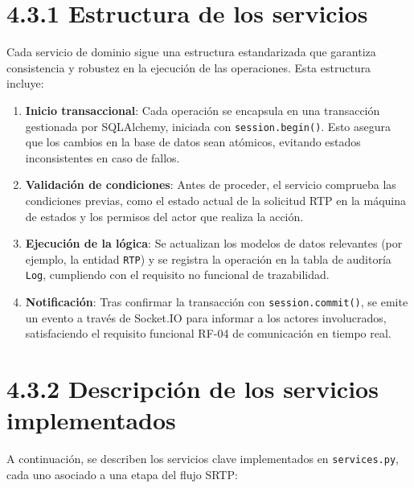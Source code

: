\section*{4.3.1 Estructura de los servicios}

Cada servicio de dominio sigue una estructura estandarizada que garantiza consistencia y robustez en la ejecución de las operaciones. Esta estructura incluye:

\begin{enumerate}
    \item \textbf{Inicio transaccional}: Cada operación se encapsula en una transacción gestionada por SQLAlchemy, iniciada con \texttt{session.begin()}. Esto asegura que los cambios en la base de datos sean atómicos, evitando estados inconsistentes en caso de fallos.
    \item \textbf{Validación de condiciones}: Antes de proceder, el servicio comprueba las condiciones previas, como el estado actual de la solicitud RTP en la máquina de estados y los permisos del actor que realiza la acción.
    \item \textbf{Ejecución de la lógica}: Se actualizan los modelos de datos relevantes (por ejemplo, la entidad \texttt{RTP}) y se registra la operación en la tabla de auditoría \texttt{Log}, cumpliendo con el requisito no funcional de trazabilidad.
    \item \textbf{Notificación}: Tras confirmar la transacción con \texttt{session.commit()}, se emite un evento a través de Socket.IO para informar a los actores involucrados, satisfaciendo el requisito funcional RF-04 de comunicación en tiempo real.
\end{enumerate}

\section*{4.3.2 Descripción de los servicios implementados}

A continuación, se describen los servicios clave implementados en \texttt{services.py}, cada uno asociado a una etapa del flujo SRTP:

